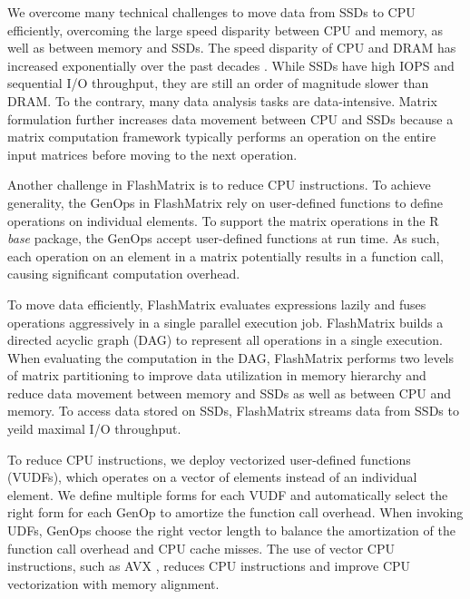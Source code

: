 
We overcome many technical challenges to move data from SSDs to CPU efficiently,
overcoming the large speed disparity between CPU and memory, as well as between
memory and
SSDs. The speed disparity of CPU and DRAM has increased exponentially over
the past decades \cite{Wilkes01}. While SSDs have high IOPS and sequential
I/O throughput, they are still an order of magnitude slower than DRAM.
To the contrary, many data analysis tasks are data-intensive. Matrix
formulation further increases data movement between CPU and SSDs because
a matrix computation framework typically performs an operation
on the entire input matrices before moving to the next operation.

Another challenge in FlashMatrix is to reduce CPU instructions. To achieve
generality, the GenOps in FlashMatrix rely on user-defined functions to define
operations on individual elements. To support the matrix operations in the R
\textit{base} package, the GenOps accept user-defined functions at run time.
As such, each operation on an element in a matrix potentially results in
a function call, causing significant computation overhead.

To move data efficiently, FlashMatrix evaluates expressions lazily and fuses
operations aggressively in a single parallel execution job.
FlashMatrix builds a directed acyclic graph (DAG) to represent all operations
in a single execution. When evaluating the computation in the DAG, FlashMatrix
performs two levels of matrix partitioning to improve data utilization in
memory hierarchy and reduce data movement between memory and SSDs
as well as between CPU and memory. To access data stored on SSDs, FlashMatrix
streams data from SSDs to yeild maximal I/O throughput.


To reduce CPU instructions, we deploy vectorized user-defined
functions (VUDFs), which operates on a vector of elements instead of
an individual element. We define multiple forms for each VUDF and automatically
select the right form for each GenOp to amortize the function call overhead.
When invoking UDFs, GenOps choose the right vector length to balance
the amortization of the function call overhead and CPU cache misses. The use
of vector CPU instructions, such as AVX \cite{avx}, reduces CPU
instructions and improve CPU vectorization with memory alignment.

